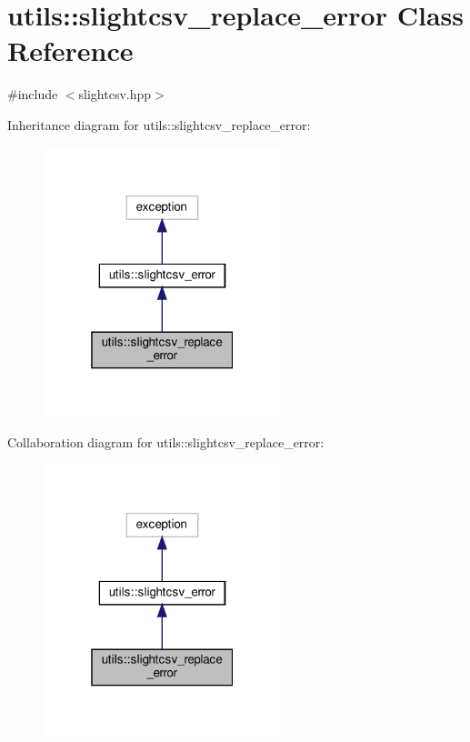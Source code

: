 \hypertarget{classutils_1_1slightcsv__replace__error}{}\section{utils\+:\+:slightcsv\+\_\+replace\+\_\+error Class Reference}
\label{classutils_1_1slightcsv__replace__error}


{\ttfamily \#include $<$slightcsv.\+hpp$>$}



Inheritance diagram for utils\+:\+:slightcsv\+\_\+replace\+\_\+error\+:\nopagebreak
\begin{figure}[H]
\begin{center}
\leavevmode
\includegraphics[width=196pt]{classutils_1_1slightcsv__replace__error__inherit__graph}
\end{center}
\end{figure}


Collaboration diagram for utils\+:\+:slightcsv\+\_\+replace\+\_\+error\+:\nopagebreak
\begin{figure}[H]
\begin{center}
\leavevmode
\includegraphics[width=196pt]{classutils_1_1slightcsv__replace__error__coll__graph}
\end{center}
\end{figure}


